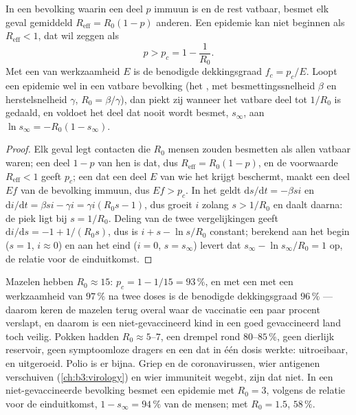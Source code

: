 \begin{theorem}\label{thm:b3:adaptive-immunity:herd}
In een bevolking waarin een deel $p$ immuun is en de rest vatbaar,
besmet elk geval gemiddeld $R_{\text{eff}} = R_{0}(1 -
p)$ anderen. Een epidemie kan niet beginnen als $R_{\text{eff}} < 1$,
dat wil zeggen als
\[
p > p_{c} = 1 - \frac{1}{R_{0}} .
\]
Met een  van werkzaamheid $E$ is de benodigde dekkingsgraad
$f_{c} = p_{c}/E$. Loopt een epidemie wel in een vatbare bevolking (het
, met besmettingssnelheid $\beta$ en herstelsnelheid $\gamma$,
$R_{0} =
\beta/\gamma$), dan piekt zij wanneer het vatbare deel tot $1/R_{0}$ is
gedaald, en voldoet het deel dat nooit wordt besmet, $s_{\infty}$, aan
$\ln s_{\infty} = -R_{0}(1 - s_{\infty})$.
\end{theorem}
\begin{proof}
Elk geval legt contacten die $R_{0}$ mensen zouden besmetten als allen
vatbaar waren; een deel $1 - p$ van hen is dat, dus $R_{\text{eff}} =
R_{0}(1-p)$, en de voorwaarde $R_{\text{eff}} < 1$ geeft $p_{c}$; een
 dat een deel $E$ van wie het krijgt beschermt, maakt een deel
$Ef$ van de bevolking immuun, dus $Ef > p_{c}$. In het  geldt
$\mathrm{d}s/\mathrm{d}t = -\beta si$ en $\mathrm{d}i/\mathrm{d}t =
\beta si - \gamma i = \gamma i(R_{0}s - 1)$, dus groeit $i$ zolang $s >
1/R_{0}$ en daalt daarna: de piek ligt bij $s = 1/R_{0}$. Deling van de
twee vergelijkingen geeft $\mathrm{d}i/\mathrm{d}s = -1 + 1/(R_{0}s)$,
dus is $i + s -
\ln s/R_{0}$ constant; berekend aan het begin ($s = 1$, $i
\approx 0$) en aan het eind ($i = 0$, $s = s_{\infty}$) levert dat
$s_{\infty} - \ln s_{\infty}/R_{0} = 1$ op, de relatie voor de
einduitkomst.
\end{proof}

\begin{example}\label{ex:b3:adaptive-immunity:measles}
Mazelen hebben $R_{0} \approx 15$: $p_{c} = 1 - 1/15 = 93\,\%$, en met
een  met een werkzaamheid van $97\,\%$ na twee doses is de
benodigde dekkingsgraad $96\,\%$ --- daarom keren de mazelen terug
overal waar de vaccinatie een paar procent verslapt, en daarom is een
niet-gevaccineerd kind in een goed gevaccineerd land toch veilig.
Pokken hadden $R_{0} \approx 5$--$7$, een drempel rond $80$--$85\,\%$,
geen dierlijk reservoir, geen symptoomloze dragers en een  dat in
één dosis werkte: uitroeibaar, en uitgeroeid. Polio is er bijna. Griep
en de coronavirussen, wier antigenen verschuiven
(\cref{ch:b3:virology}) en wier immuniteit wegebt, zijn dat niet. In
een niet-gevaccineerde bevolking besmet een epidemie met $R_{0} = 3$,
volgens de relatie voor de einduitkomst, $1 - s_{\infty} = 94\,\%$ van
de mensen; met $R_{0} = 1.5$, $58\,\%$.
\end{example}

